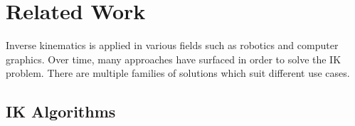 \chapter{Related Work}
Inverse kinematics is applied in various fields such as robotics and computer
graphics. Over time, many approaches have surfaced in order to solve the IK
problem. There are multiple families of solutions \cite{Aristidou2011} which
suit different use cases.

\section{IK Algorithms}
